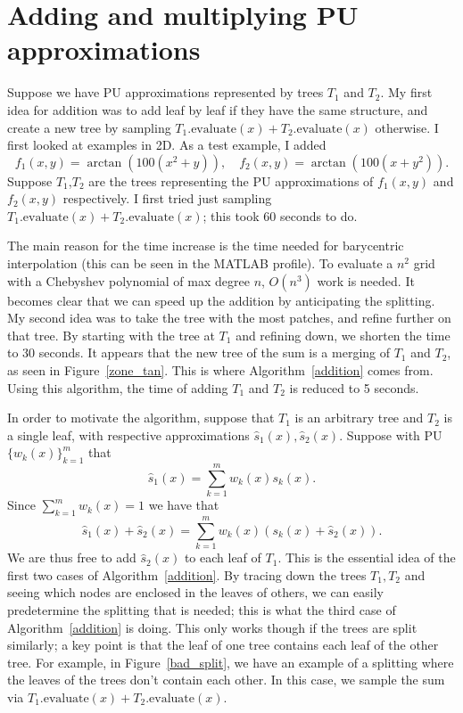 \documentclass{article}
\begin{document}
\section{Adding and multiplying PU approximations}
Suppose we have PU approximations represented by trees $T_1$ and $T_2$. My first idea for addition was to add leaf by leaf if they have the same structure, and create a new tree by sampling $T_1.\text{evaluate}(x)+T_2.\text{evaluate}(x)$ otherwise. I first looked at examples in 2D. As a test example, I added
\begin{equation}
f_1(x,y) = \arctan(100(x^2+y)), \quad f_2(x,y) = \arctan(100(x+y^2)).
\end{equation}
Suppose $T_1$,$T_2$ are the trees representing the PU approximations of $f_1(x,y)$ and $f_2(x,y)$ respectively. I first tried just sampling $T_1.\text{evaluate}(x)+T_2.\text{evaluate}(x)$; this took 60 seconds to do.

The main reason for the time increase is the time needed for barycentric interpolation (this can be seen in the MATLAB profile). To evaluate a $n^2$ grid with a Chebyshev polynomial of max degree $n$, $O(n^3)$ work is needed. It becomes clear that we can speed up the addition by anticipating the splitting. My second idea was to take the tree with the most patches, and refine further on that tree. By starting with the tree at $T_1$ and refining down, we shorten the time to 30 seconds. It appears that the new tree of the sum is a merging of $T_1$ and $T_2$, as seen in Figure~\ref{zone_tan}. This is where Algorithm~\ref{addition} comes from. Using this algorithm, the time of adding $T_1$ and $T_2$ is reduced to 5 seconds. 

In order to motivate the algorithm, suppose that $T_1$ is an arbitrary tree and $T_2$ is a single leaf, with respective approximations $\hat{s}_1(x),\hat{s}_2(x)$. Suppose with PU $\{w_k(x)\}_{k=1}^m$ that
 \begin{equation}
 \hat{s}_1(x)=\sum_{k=1}^m w_k(x) s_k(x).
 \end{equation}
Since $\sum_{k=1}^m w_k(x) = 1$ we have that
 \begin{equation}
 \hat{s}_1(x)+ \hat{s}_2(x)=\sum_{k=1}^m w_k(x) (s_k(x)+ \hat{s}_2(x)).
 \end{equation}
We are thus free to add $\hat{s}_2(x)$ to each leaf of $T_1$. This is the essential idea of the first two cases of Algorithm~\ref{addition}. By tracing down the trees $T_1,T_2$ and seeing which nodes are enclosed in the leaves of others, we can easily predetermine the splitting that is needed; this is what the third case of Algorithm~\ref{addition} is doing. This only works though if the trees are split similarly; a key point is that the leaf of one tree contains each leaf of the other tree. For example, in Figure~\ref{bad_split}, we have an example of a splitting where the leaves of the trees don't contain each other. In this case, we sample the sum via $T_1.\text{evaluate}(x)+T_2.\text{evaluate}(x)$.
\end{document}
